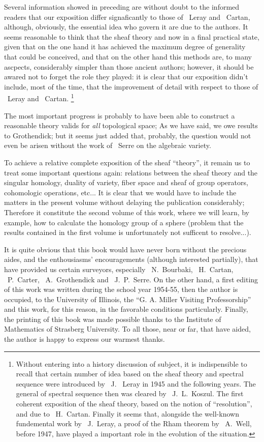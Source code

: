 Several information showed in preceding are without doubt to the informed readers that our exposition differ signaficantly to those of ~Leray and ~Cartan, 
although, obviously, the essential idea who govern it are due to the authors. 
It seems reasonable to think that the sheaf theory and now in a final practical state, 
\oldpage[VI]
given that on the one hand it has achieved the maximum degree of generality that could be conceived, and that on the other hand this methods are, 
to many ascpects, considerably simpler than those ancient authors; 
however, it should be awared not to forget the role they played: 
it is clear that our exposition didn't include, most of the time, that the improvement of detail with respect to those of ~Leray and ~Cartan. 
\footnote[1]{Without entering into a history discussion of subject, 
it is indispensible to recall that certain number of idea based on the sheaf theory and spectral sequence were introduced by ~J. ~Leray in 1945 and the following years. 
The general of spectral sequence then was cleared by ~J.~L.~Koszul. 
The first coherent exposition of the sheaf theory, based on the notion of ``resolution'', and due to ~H.~Cartan. 
Finally it seems that, alongside the well-known fundemental work by ~J.~Leray, 
a proof of the Rham theorem by ~A.~Well, before 1947, have played a important role in the evolution of the situation.}

The most important progress is probably to have been able to construct a reasonable theory valids for \emph{all} topological space; 
As we have said, we owe results to Grothendick; but it seems just added that, probably, 
the question would not even be arisen without the work of ~Serre on the algebraic variety.

To achieve a relative complete exposition of the sheaf ``theory'', it remain us to treat some important questions again: 
relations between the sheaf theory and the singular homology, duality of variety, fiber space and sheaf of group operators, cohomologic operations, etc... 
It is clear that we would have to include the matters in the present volume without delaying the publication considerably; 
Therefore it constitute the second volume of this work, where we will learn, by example, how to calculate the homology group of a sphere 
(problem that the results contained in the first volume is unfortunately not sufficent to resolve...).

It is quite obvious that this book would have never born without the precious aides, 
and the enthousiasms' encouragements (although interested partially), that have provided us certain surveyors, 
especially ~N.~Bourbaki, ~H.~Cartan, ~P.~Carter, ~A.~Grothendick and ~J.~P.~Serre. 
On the other hand, a first editing of this work was written during the school year 1954-55, 
then the author is occupied, to the University of Illinois, the ``G. A. Miller Visiting Professorship'' and this work, 
for this reason, in the favorable conditions particularly. 
Finally, the printing of this book was made possible thanks to the Institute of Mathematics of Strasberg University. 
To all those, near or far, that have aided, the author is happy to express our warmest thanks.


